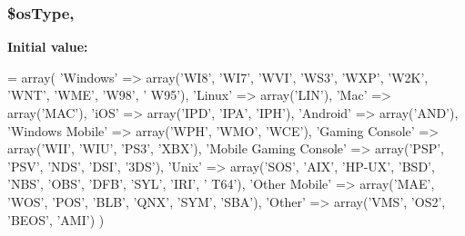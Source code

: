 \hypertarget{class_user_agent_parser_a35cddafe55870d08e38ce841e7902a4b}{
\subsubsection[{\$os\-Type}]{\setlength{\rightskip}{0pt plus 5cm}\$os\-Type\hspace{0.3cm}{\ttfamily [static]}, {\ttfamily [protected]}}}\label{class_user_agent_parser_a35cddafe55870d08e38ce841e7902a4b}
{\bfseries Initial value\-:}
\begin{DoxyCode}
= array(
        \textcolor{stringliteral}{'Windows'}               => array(\textcolor{stringliteral}{'WI8'}, \textcolor{stringliteral}{'WI7'}, \textcolor{stringliteral}{'WVI'}, \textcolor{stringliteral}{'WS3'}, \textcolor{stringliteral}{'WXP'}, \textcolor{stringliteral}{'W2K'}, \textcolor{stringliteral}{'WNT'}, \textcolor{stringliteral}{'WME'}, \textcolor{stringliteral}{'W98'}, \textcolor{stringliteral}{'
      W95'}),
        \textcolor{stringliteral}{'Linux'}                 => array(\textcolor{stringliteral}{'LIN'}),
        \textcolor{stringliteral}{'Mac'}                   => array(\textcolor{stringliteral}{'MAC'}),
        \textcolor{stringliteral}{'iOS'}                   => array(\textcolor{stringliteral}{'IPD'}, \textcolor{stringliteral}{'IPA'}, \textcolor{stringliteral}{'IPH'}),
        \textcolor{stringliteral}{'Android'}               => array(\textcolor{stringliteral}{'AND'}),
        \textcolor{stringliteral}{'Windows Mobile'}        => array(\textcolor{stringliteral}{'WPH'}, \textcolor{stringliteral}{'WMO'}, \textcolor{stringliteral}{'WCE'}),
        \textcolor{stringliteral}{'Gaming Console'}        => array(\textcolor{stringliteral}{'WII'}, \textcolor{stringliteral}{'WIU'}, \textcolor{stringliteral}{'PS3'}, \textcolor{stringliteral}{'XBX'}),
        \textcolor{stringliteral}{'Mobile Gaming Console'} => array(\textcolor{stringliteral}{'PSP'}, \textcolor{stringliteral}{'PSV'}, \textcolor{stringliteral}{'NDS'}, \textcolor{stringliteral}{'DSI'}, \textcolor{stringliteral}{'3DS'}),
        \textcolor{stringliteral}{'Unix'}                  => array(\textcolor{stringliteral}{'SOS'}, \textcolor{stringliteral}{'AIX'}, \textcolor{stringliteral}{'HP-UX'}, \textcolor{stringliteral}{'BSD'}, \textcolor{stringliteral}{'NBS'}, \textcolor{stringliteral}{'OBS'}, \textcolor{stringliteral}{'DFB'}, \textcolor{stringliteral}{'SYL'}, \textcolor{stringliteral}{'IRI'}, \textcolor{stringliteral}{'
      T64'}),
        \textcolor{stringliteral}{'Other Mobile'}          => array(\textcolor{stringliteral}{'MAE'}, \textcolor{stringliteral}{'WOS'}, \textcolor{stringliteral}{'POS'}, \textcolor{stringliteral}{'BLB'}, \textcolor{stringliteral}{'QNX'}, \textcolor{stringliteral}{'SYM'}, \textcolor{stringliteral}{'SBA'}),
        \textcolor{stringliteral}{'Other'}                 => array(\textcolor{stringliteral}{'VMS'}, \textcolor{stringliteral}{'OS2'}, \textcolor{stringliteral}{'BEOS'}, \textcolor{stringliteral}{'AMI'})
    )
\end{DoxyCode}


